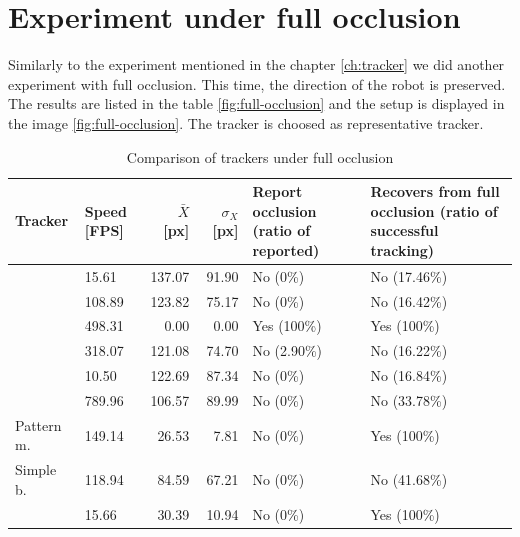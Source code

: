 \section{Experiment under full occlusion}

Similarly to the experiment mentioned in the chapter \ref{ch:tracker} we did
another experiment with full occlusion. This time, the direction of the robot
is preserved. The results are listed in the table \ref{fig:full-occlusion} and
the setup is displayed in the image \ref{fig:full-occlusion}. The \hsv{}
tracker is choosed as representative tracker.

\begin{table}
\centering
\begin{tabular}{l|p{1.2cm}|r|r|p{2.5cm}|p{3.5cm}}
Tracker & Speed [FPS] & $\bar{X}$ [px] & $\sigma_X$ [px]&  Report occlusion (ratio of reported) & Recovers from full occlusion (ratio of successful tracking) \\
\hline
\boost{} & 15.61 & 137.07 & 91.90 & No (0\%) & No (17.46\%) \\
\corr{} & 108.89 & 123.82 & 75.17 & No (0\%) & No (16.42\%) \\
\hsv{} & 498.31 & 0.00 & 0.00 & Yes (100\%) & Yes (100\%) \\
\medflow{} & 318.07 & 121.08 & 74.70 & No (2.90\%) & No (16.22\%) \\
\mil{} & 10.50 & 122.69 & 87.34 & No (0\%) & No (16.84\%) \\
\mosse{} & 789.96 & 106.57 & 89.99 & No (0\%) & No (33.78\%) \\
Pattern m. & 149.14 & 26.53 & 7.81 & No (0\%) & Yes (100\%) \\
Simple b. & 118.94 & 84.59 & 67.21 & No (0\%) & No (41.68\%) \\
\tld{} & 15.66 & 30.39 & 10.94 & No (0\%) & Yes (100\%) \\
\end{tabular}
\caption{Comparison of trackers under full occlusion}
\label{table:full-occlusion}
\end{table}

